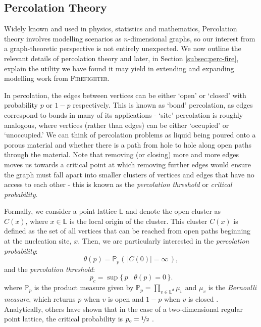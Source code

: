 \documentclass[../report.tex]{subfiles}
\begin{document}

\subsection{Percolation Theory}
\label{sec:perc}

Widely known and used in physics, statistics and mathematics, Percolation theory involves modelling scenarios as $n$-dimensional graphs, so our interest from a graph-theoretic perspective is not entirely unexpected. We now outline the relevant details of percolation theory and later, in Section \ref{subsec:perc-fire}, explain the utility we have found it may yield in extending and expanding modelling work from {\scshape Firefighter}.

In percolation, the edges between vertices can be either `open' or `closed' with probability $p$ or $1-p$ respectively. This is known as `bond' percolation, as edges correspond to bonds in many of its applications - `site' percolation is roughly analogous, where vertices (rather than edges) can be either `occupied' or `unoccupied.' We can think of percolation problems as liquid being poured onto a porous material and whether there is a path from hole to hole along open paths through the material. Note that removing (or closing) more and more edges moves us towards a critical point at which removing further edges would ensure the graph must fall apart into smaller clusters of vertices and edges that have no access to each other \cite{grimmett_1999} - this is known as the {\it percolation threshold} or {\it critical probability}. 

Formally, we consider a point lattice $\mathbb{L}$ and denote the open cluster as $C(x)\text{,~where~}x\in\mathbb{L}$ is the local origin of the cluster. This cluster $C(x)$ is defined as the set of all vertices that can be reached from open paths beginning at the nucleation site, $x$. Then, we are particularly interested in the \emph{percolation probability}:
$$
\theta(p) = \mathbb{P}_p(\,|C(0)|=\infty\,),
$$
and the \emph{percolation threshold}:
$$
p_c = \sup\{\,p \mid \theta(p)=0\,\}.
$$
where $\mathbb{P}_p$ is the product measure given by
$\displaystyle \mathbb{P}_p=\prod_{v\in\mathbb{L}^d}\mu_v$
and $\mu_v$ is the \emph{Bernoulli measure}, which returns $p$ when $v$ is open and $1-p$ when $v$ is closed \cite{klenke_2014}. Analytically, others have shown that in the case of a two-dimensional regular point lattice, the critical probability is $p_c=\nicefrac{1}{2}$ \cite{kersten_1980}.
\end{document}
